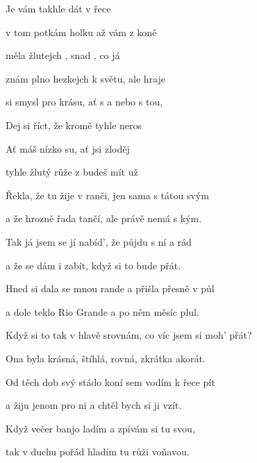 

\zs
Je vám takhle  dát  v řece 

v tom potkám holku  až  vám z koně 

měla  žlutejch , snad , co já 

znám plno hezkejch  k světu, ale  hraje 
\ks

\zr
{} si  smysl pro krásu, ať s  a nebo s tou,

Dej si říct, že kromě  tyhle  neros

Ať máš  nízko su, ať jsi  zloděj 

tyhle žlutý růže z  budeš  mít už 
\kr

\zs
Řekla, že tu žije v ranči, jen sama s tátou svým

a že hrozně řada tančí, ale právě nemá s kým.

Tak já jsem se jí nabíd', že půjdu s ní a rád

a že se dám i zabít, když si to bude přát.
\ks

\zs
Hned si dala se mnou rande a přišla přesně v půl

a dole teklo Rio Grande a po něm měsíc plul.

Když si to tak v hlavě srovnám, co víc jsem si moh' přát?

Ona byla krásná, štíhlá, rovná, zkrátka akorát.
\ks

\zr  \kr

\zs
Od těch dob svý stádo koní sem vodím k řece pít

a žiju jenom pro ni a chtěl bych si ji vzít.

Když večer banjo ladím a zpívám si tu svou,

tak v duchu pořád hladím tu růži voňavou.
\ks

\zr  \kr

\kp
